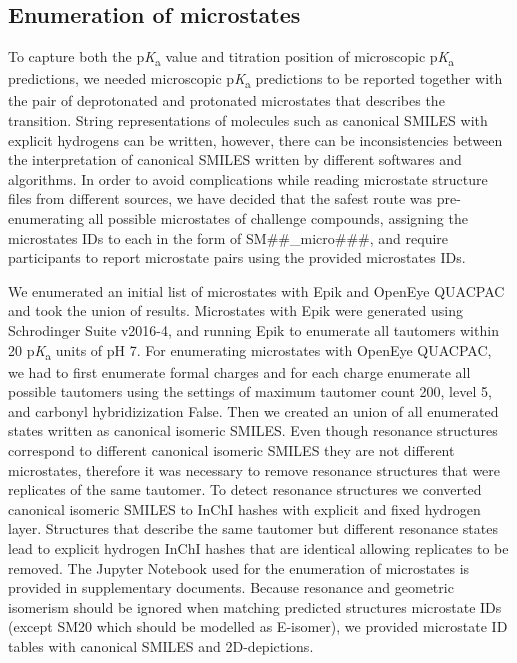 \documentclass[9pt,lineno,final]{elife}
\newcommand{\pKa}{p\textit{K}\textsubscript{a}}
\begin{document}
\subsection{Enumeration of microstates} \label{section-enumeration-of-microstates}

To capture both the \pKa{} value and titration position of microscopic \pKa{} predictions, we needed microscopic \pKa{} predictions to be reported together with the pair of deprotonated and protonated microstates that describes the transition. 
String representations of molecules such as canonical SMILES with explicit hydrogens can be written, however, there can be inconsistencies between the interpretation of canonical SMILES written by different softwares and algorithms.
In order to avoid complications while reading microstate structure files from different sources, we have decided that the safest route was pre-enumerating all possible microstates of challenge compounds, assigning the microstates IDs to each in the form of SM\#\#\_micro\#\#\#, and require participants to report microstate pairs using the provided microstates IDs.   

We enumerated an initial list of microstates with Epik and OpenEye QUACPAC and took the union of results. 
Microstates with Epik were generated using Schrodinger Suite v2016-4, and running Epik to enumerate all tautomers within 20 \pKa{} units of pH 7.
For enumerating microstates with OpenEye QUACPAC, we had to first enumerate formal charges and for each charge enumerate all possible tautomers using the settings of maximum tautomer count 200, level 5, and carbonyl hybridizization False.
Then we created an union of all enumerated states written as canonical isomeric SMILES.
Even though resonance structures correspond to different canonical isomeric SMILES they are not different microstates, therefore it was necessary to remove resonance structures that were replicates of the same tautomer. To detect resonance structures we converted canonical isomeric SMILES to InChI hashes with explicit and fixed hydrogen layer. Structures that describe the same tautomer but different resonance states lead to explicit hydrogen InChI hashes that are identical allowing replicates to be removed. The Jupyter Notebook used for the enumeration of microstates is provided in supplementary documents. Because resonance and geometric isomerism should be ignored when matching predicted structures microstate IDs (except SM20 which should be modelled as E-isomer), we provided microstate ID tables with canonical SMILES and 2D-depictions. 
\end{document}
